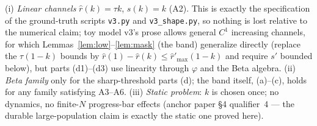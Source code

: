 \begin{remark}\label{rem:restriction}
(i) \emph{Linear channels} $\hat r(k) = \tau k$, $s(k) = k$ (A2). This is exactly the
specification of the ground-truth scripts \texttt{v3.py} and \texttt{v3\_shape.py}, so
nothing is lost relative to the numerical claim; toy model v3's prose allows general
$C^1$ increasing channels, for which Lemmas~\ref{lem:low}--\ref{lem:mask} (the band)
generalize directly (replace the $\tau(1 - k)$ bounds by
$\hat r(1) - \hat r(k) \le \hat r'_{\max}(1 - k)$ and require $s'$ bounded below), but
parts (d1)--(d3) use linearity through $\varphi$ and the Beta algebra.
(ii) \emph{Beta family} only for the sharp-threshold parts (d); the band itself,
(a)--(c), holds for any family satisfying A3--A6. (iii) \emph{Static problem}: $k$ is
chosen once; no dynamics, no finite-$N$ progress-bar effects (anchor paper \S4
qualifier~4 --- the durable large-population claim is exactly the static one proved
here).
\end{remark}

